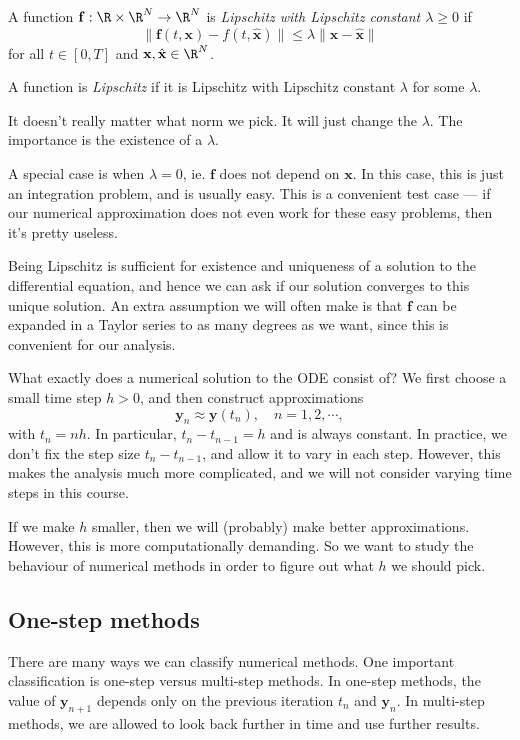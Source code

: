 \documentclass[a4paper]{article}
\begin{document}
\begin{defi}
  A function $\mathbf{f}: \R \times \R^N \to \R^N$ is \emph{Lipschitz with Lipschitz constant $\lambda \geq 0$} if
  \[
    \|\mathbf{f}(t, \mathbf{x}) - f(t, \hat{\mathbf{x}})\| \leq \lambda \|\mathbf{x} - \hat{\mathbf{x}}\|
  \]
  for all $t \in [0, T]$ and $\mathbf{x}, \hat{\mathbf{x}} \in \R^N$.

  A function is \emph{Lipschitz} if it is Lipschitz with Lipschitz constant $\lambda$ for some $\lambda$.
\end{defi}
It doesn't really matter what norm we pick. It will just change the $\lambda$. The importance is the existence of a $\lambda$.

A special case is when $\lambda = 0$, ie. $\mathbf{f}$ does not depend on $\mathbf{x}$. In this case, this is just an integration problem, and is usually easy. This is a convenient test case --- if our numerical approximation does not even work for these easy problems, then it's pretty useless.

Being Lipschitz is sufficient for existence and uniqueness of a solution to the differential equation, and hence we can ask if our solution converges to this unique solution. An extra assumption we will often make is that $\mathbf{f}$ can be expanded in a Taylor series to as many degrees as we want, since this is convenient for our analysis.

What exactly does a numerical solution to the ODE consist of? We first choose a small time step $h > 0$, and then construct approximations
\[
  \mathbf{y}_n \approx \mathbf{y}(t_n),\quad n = 1, 2, \cdots,
\]
with $t_n = nh$. In particular, $t_n - t_{n - 1} = h$ and is always constant. In practice, we don't fix the step size $t_n - t_{n - 1}$, and allow it to vary in each step. However, this makes the analysis much more complicated, and we will not consider varying time steps in this course.

If we make $h$ smaller, then we will (probably) make better approximations. However, this is more computationally demanding. So we want to study the behaviour of numerical methods in order to figure out what $h$ we should pick.

\subsection{One-step methods}
There are many ways we can classify numerical methods. One important classification is one-step versus multi-step methods. In one-step methods, the value of $\mathbf{y}_{n + 1}$ depends only on the previous iteration $t_n$ and $\mathbf{y}_n$. In multi-step methods, we are allowed to look back further in time and use further results.
\end{document}
